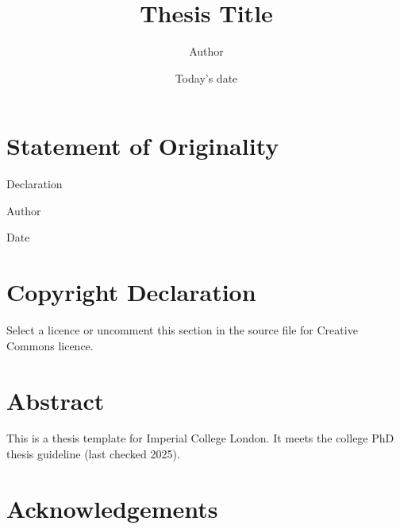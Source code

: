 \documentclass[12pt]{report}
\begin{document}
\title{Thesis Title}
\author{Author}
\date{Today's date} 

\maketitle
\newpage
{}
\setcounter{page}{2}
\chapter*{Statement of Originality}
Declaration

\hspace{5.5in} Author

\hspace{5.5in} Date



\chapter*{Copyright Declaration}
Select a licence or uncomment this section in the source file for Creative Commons licence.



\chapter*{Abstract}

This is a thesis template for Imperial College London. It meets the college PhD thesis guideline (last checked 2025).

\chapter*{Acknowledgements}

\tableofcontents

\listoffigures
\listoftables






\clearpage
\begingroup
    \linespread{1}
    
\endgroup
\begin{appendices}

\end{appendices}
\end{document}
